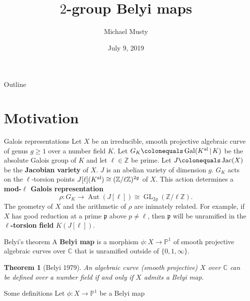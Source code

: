 \documentclass[xcolor=dvipsnames]{beamer}
\title{$2$-group Belyi maps}
\author{Michael Musty}
\date{July 9, 2019}
\institute{Dartmouth College}
\theoremstyle{plain}
\newtheorem*{thm}{Theorem}
\newcommand{\PP}{\mathbb P}
\newcommand{\CC}{\mathbb C}
\newcommand{\ZZ}{\mathbb Z}
\newcommand{\Kal}{{{K}^{\textup{al}}}}
\DeclareMathOperator{\Aut}{Aut}
\DeclareMathOperator{\Gal}{Gal}
\DeclareMathOperator{\GL}{GL}
\DeclareMathOperator{\Jac}{Jac}
\begin{document}
  \maketitle
  \begin{frame}{Outline}
    \tableofcontents
  \end{frame}
  \section{Motivation}{
    \begin{frame}{Galois representations}
      Let $X$ be an irreducible, smooth
      projective algebraic curve of genus $g\geq 1$
      over a number field $K$.
      Let $G_K\colonequals\Gal(\Kal\,|\,K)$ be
      the absolute Galois group of $K$ and
      let $\ell\in\ZZ$ be prime.
      \pause\newline
      Let $J\colonequals\Jac(X)$ be the
      \textbf{Jacobian variety} of $X$.
      $J$ is an abelian variety of dimension $g$.
      \pause\newline
      $G_K$ acts on the $\ell$-torsion points
      $J[\ell](\Kal)\cong(\ZZ/\ell\ZZ)^{2g}$ of $X$.
      \pause\newline
      This action determines a
      \textbf{mod-$\ell$ Galois representation}
      \[
        \rho\colon G_K\to\Aut(J[\ell])\cong\GL_{2g}(\ZZ/\ell\ZZ).
      \]
      \pause
      The geometry of $X$ and the arithmetic of
      $\rho$ are inimately related.
      \pause
      For example,
      if $X$ has good reduction at a prime
      $\mathfrak{p}$ above
      $p\neq\ell$,
      then $\mathfrak{p}$
      will be unramified in the
      \textbf{$\ell$-torsion field}
      $K(J[\ell])$.
    \end{frame}
    \begin{frame}{Belyi's theorem}
      A \textbf{Belyi map}
      is a morphism
      $\phi\colon X\to\PP^1$
      of smooth projective algebraic curves
      over $\CC$
      that is unramified outside of
      $\{0,1,\infty\}$.
      \pause
      \begin{thm}[Belyi 1979]
        \vspace{1pt}
        An algebraic curve (smooth projective)
        $X$ over $\CC$ can be defined over a number
        field if and only if $X$ admits a
        Belyi map.
      \end{thm}
    \end{frame}
    \begin{frame}{Some definitions}
      Let $\phi\colon X\to\PP^1$ be a Belyi map

\end{frame}}
\end{document}
